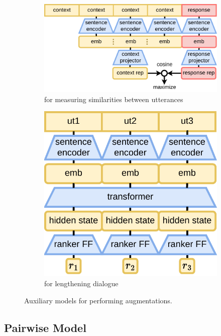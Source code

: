 \documentclass{article}
\begin{document}
\begin{figure}[!htb]
    \centering
    \begin{subfigure}[t]{0.6\linewidth}
        \centering
        \includegraphics[width=0.9\linewidth]{figures/pairwise.drawio.pdf}
        \caption{for measuring similarities between utterances}
        \label{fig:pairwise}
    \end{subfigure}
    \begin{subfigure}[t]{0.35\linewidth}
        \centering
        \includegraphics[width=0.9\linewidth]{figures/listwise.drawio.pdf}
        \caption{for lengthening dialogue}
        \label{fig:listwise}
    \end{subfigure}
    \caption{Auxiliary models for performing augmentations.}
    \label{fig:enter-label}
\end{figure}

\subsection{Pairwise Model}
\end{document}
